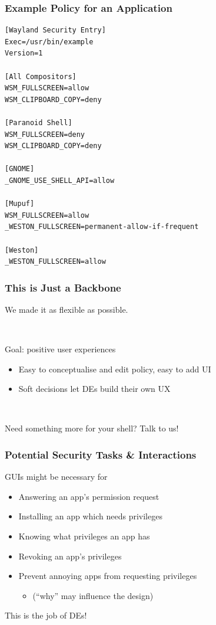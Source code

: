 \begin{frame}[fragile]
\frametitle{Example Policy for an Application}

\tiny
	\begin{verbatim}
[Wayland Security Entry]
Exec=/usr/bin/example
Version=1

[All Compositors]
WSM_FULLSCREEN=allow
WSM_CLIPBOARD_COPY=deny

[Paranoid Shell]
WSM_FULLSCREEN=deny
WSM_CLIPBOARD_COPY=deny

[GNOME]
_GNOME_USE_SHELL_API=allow

[Mupuf]
WSM_FULLSCREEN=allow
_WESTON_FULLSCREEN=permanent-allow-if-frequent

[Weston]
_WESTON_FULLSCREEN=allow
	\end{verbatim}
\normalsize

\end{frame}


\begin{frame}
\frametitle{This is Just a Backbone}

	We made it as flexible as possible.
	
	~

	\begin{block}{Goal: positive user experiences}
	\begin{itemize}
	\item Easy to conceptualise and edit policy, easy to add UI
	\item Soft decisions let DEs build their own UX
	\end{itemize}
	\end{block}
	
	~
	
	Need something more for your shell? Talk to us!
\end{frame}

	
	
\begin{frame}
\frametitle{Potential Security Tasks \& Interactions}

  \begin{block}{GUIs might be necessary for}
  \begin{itemize}
  \item Answering an app's permission request
  \item Installing an app which needs privileges
  \item Knowing what privileges an app has
  \item Revoking an app's privileges
  \item Prevent annoying apps from requesting privileges
    \begin{itemize}
    \item {\footnotesize (``why'' may influence the design)}
    \end{itemize}
  \end{itemize}
  \end{block}

This is the job of DEs!

\end{frame}


